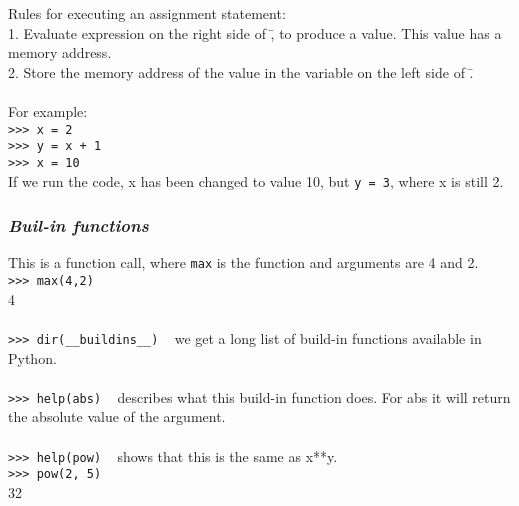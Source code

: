 \documentclass{article}
\begin{document}
{{{Rules for executing an assignment statement:\\
1. Evaluate expression on the right side of \=, to produce a value. This value has a memory address.\\
2. Store the memory address of the value in the variable on the left side of \=. \\
\\
For example: \\
\texttt{>>> x = 2}\\
\texttt{>>> y = x + 1}\\
\texttt{>>> x = 10}\\
If we run the code, x has been changed to value 10, but \texttt{y = 3}, where x is still 2. \\
\subsubsection{\small\textsl{Buil-in functions}}
This is a function call, where \texttt{max} is the function and arguments are 4 and 2.\\
\texttt{>>> max(4,2)}\\
4\\
\\
\texttt{>>> dir(\_\_buildins\_\_)} ~ we get a long list of build-in functions available in Python.\\
\\
\texttt{>>> help(abs)} ~ describes what this build-in function does. For abs it will return the absolute value of the argument.\\
\\
\texttt{>>> help(pow)} ~ shows that this is the same as x**y.\\
\texttt{>>> pow(2, 5)}\\
32\\

}}}
\end{document}
